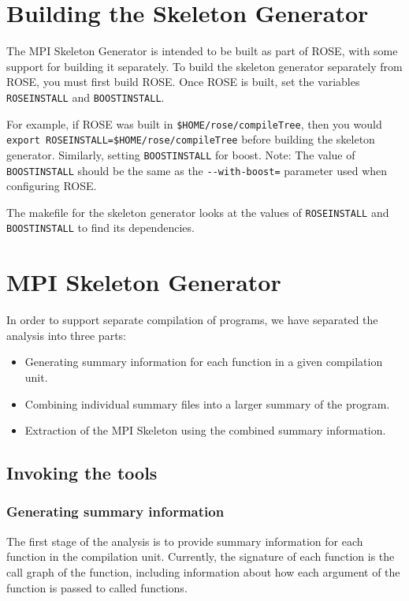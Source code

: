 \documentclass{article}
\begin{document}
\section{Building the Skeleton Generator}

The MPI Skeleton Generator is intended to be built as part of ROSE, with some
support for building it separately. To build the skeleton generator separately
from ROSE, you must first build ROSE\@. Once ROSE is built, set 
the variables \verb|ROSEINSTALL| and \verb|BOOSTINSTALL|.

For example, if ROSE was built in \verb|$HOME/rose/compileTree|, then you would
\verb|export ROSEINSTALL=$HOME/rose/compileTree| before building the skeleton
generator. Similarly, setting \verb|BOOSTINSTALL| for boost. Note: The value of
\verb|BOOSTINSTALL| should be the same as the \verb|--with-boost=| parameter
used when configuring ROSE.

The makefile for the skeleton generator looks at the values of
\verb|ROSEINSTALL| and \verb|BOOSTINSTALL| to find its dependencies.

\section{MPI Skeleton Generator}

In order to support separate compilation of programs, we have separated the
analysis into three parts:

\begin{itemize}
\item Generating summary information for each function in a given compilation unit.
\item Combining individual summary files into a larger summary of the program.
\item Extraction of the MPI Skeleton using the combined summary information.
\end{itemize}

\subsection{Invoking the tools}

\subsubsection{Generating summary information}

The first stage of the analysis is to provide summary information for each
function in the compilation unit. Currently, the signature of each function is
the call graph of the function, including information about how each argument
of the function is passed to called functions.
\end{document}
